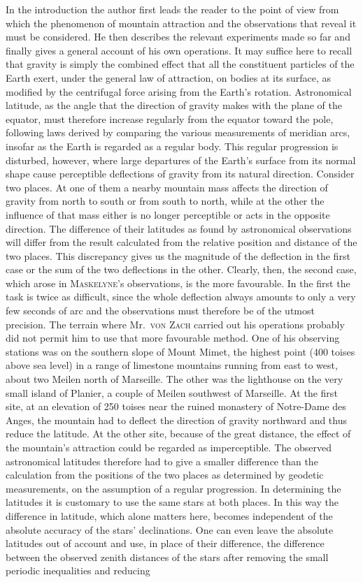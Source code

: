 In the introduction the author first leads the reader to the point of view from which the phenomenon of mountain attraction and the observations that reveal it must be considered. He then describes the relevant experiments made so far and finally gives a general account of his own operations. It may suffice here to recall that gravity is simply the combined effect that all the constituent particles of the Earth exert, under the general law of attraction, on bodies at its surface, as modified by the centrifugal force arising from the Earth’s rotation. Astronomical latitude, as the angle that the direction of gravity makes with the plane of the equator, must therefore increase regularly from the equator toward the pole, following laws derived by comparing the various measurements of meridian arcs, insofar as the Earth is regarded as a regular body. This regular progression is disturbed, however, where large departures of the Earth’s surface from its normal shape cause perceptible deflections of gravity from its natural direction. Consider two places. At one of them a nearby mountain mass affects the direction of gravity from north to south or from south to north, while at the other the influence of that mass either is no longer perceptible or acts in the opposite direction. The difference of their latitudes as found by astronomical observations will differ from the result calculated from the relative position and distance of the two places. This discrepancy gives us the magnitude of the deflection in the first case or the sum of the two deflections in the other. Clearly, then, the second case, which arose in \textsc{Maskelyne}’s observations, is the more favourable. In the first the task is twice as difficult, since the whole deflection always amounts to only a very few seconds of arc and the observations must therefore be of the utmost precision. The terrain where Mr.\ \textsc{von Zach} carried out his operations probably did not permit him to use that more favourable method. One of his observing stations was on the southern slope of Mount Mimet, the highest point (400 toises above sea level) in a range of limestone mountains running from east to west, about two Meilen north of Marseille. The other was the lighthouse on the very small island of Planier, a couple of Meilen southwest of Marseille. At the first site, at an elevation of 250 toises near the ruined monastery of Notre-Dame des Anges, the mountain had to deflect the direction of gravity northward and thus reduce the latitude. At the other site, because of the great distance, the effect of the mountain’s attraction could be regarded as imperceptible. The observed astronomical latitudes therefore had to give a smaller difference than the calculation from the positions of the two places as determined by geodetic measurements, on the assumption of a regular progression. In determining the latitudes it is customary to use the same stars at both places. In this way the difference in latitude, which alone matters here, becomes independent of the absolute accuracy of the stars’ declinations. One can even leave the absolute latitudes out of account and use, in place of their difference, the difference between the observed zenith distances of the stars after removing the small periodic inequalities and reducing 